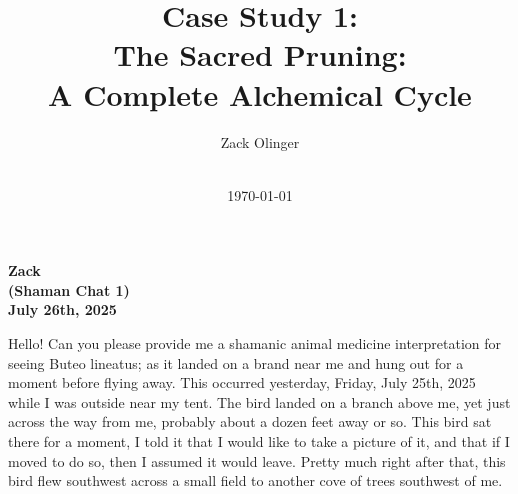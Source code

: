 \documentclass{article}
\newcommand{\docTitle}{Case Study 1: \\The Sacred Pruning: \\A Complete Alchemical Cycle}
\newcommand{\docAuthor}{Zack Olinger}
\newcommand{\docVersion}{\csSacredPruningVersion}
\begin{document}

\pagestyle{frontmatterstyle}


\begin{titlepage}
    \title{\docTitle}
    \author{\docAuthor}
    \date{
        \docVersion \\
        \vspace{1em}
        \today
    }
    \maketitle
    \thispagestyle{empty}

    \begin{abstract}
        \csSacredPruningAbstract
    \end{abstract}

\end{titlepage}


\licensepage


\fancypagestyle{plain}{
    \fancyhf{}
    \fancyfoot[L]{\docVersion}
    \fancyfoot[C]{\href{\licenseURL}{\licenseText}}
      \fancyfoot[R]{Page \thepage\ of \pageref*{LastFrontMatterPage}}
    \renewcommand{\headrulewidth}{0pt}
    \renewcommand{\footrulewidth}{0.4pt}
}


\tableofcontents
\label{LastFrontMatterPage}


\clearpage
{}
{}
\pagestyle{mainmatterstyle}



\begin{center}
\textbf{Zack}\\
\textbf{(Shaman Chat 1)}\\
\textbf{July 26th, 2025}
\end{center}

Hello! Can you please provide me a shamanic animal medicine interpretation for seeing Buteo lineatus; as it landed on a brand near me and hung out for a moment before flying away. This occurred yesterday, Friday, July 25th, 2025 while I was outside near my tent. The bird landed on a branch above me, yet just across the way from me, probably about a dozen feet away or so. This bird sat there for a moment, I told it that I would like to take a picture of it, and that if I moved to do so, then I assumed it would leave. Pretty much right after that, this bird flew southwest across a small field to another cove of trees southwest of me.
\end{document}
